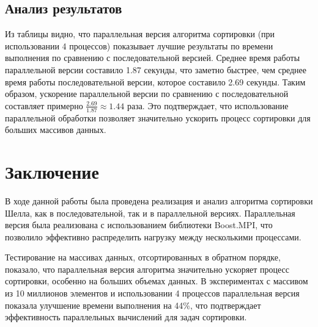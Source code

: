 \documentclass{report}
\begin{document}
\begin{table}[h!]
\centering
{}
\caption{Результаты времени выполнения сортировки для последовательной и параллельной версии}
\end{table}

\subsection*{Анализ результатов}

Из таблицы видно, что параллельная версия алгоритма сортировки (при использовании 4 процессов) показывает лучшие результаты по времени выполнения по сравнению с последовательной версией. Среднее время работы параллельной версии составило 1.87 секунды, что заметно быстрее, чем среднее время работы последовательной версии, которое составило 2.69 секунды. Таким образом, ускорение параллельной версии по сравнению с последовательной составляет примерно \( \frac{2.69}{1.87} \approx 1.44 \) раза. Это подтверждает, что использование параллельной обработки позволяет значительно ускорить процесс сортировки для больших массивов данных.

\newpage

\section*{Заключение}

В ходе данной работы была проведена реализация и анализ алгоритма сортировки Шелла, как в последовательной, так и в параллельной версиях. Параллельная версия была реализована с использованием библиотеки Boost.MPI, что позволило эффективно распределить нагрузку между несколькими процессами.

Тестирование на массивах данных, отсортированных в обратном порядке, показало, что параллельная версия алгоритма значительно ускоряет процесс сортировки, особенно на больших объемах данных. В экспериментах с массивом из 10 миллионов элементов и использовании 4 процессов параллельная версия показала улучшение времени выполнения на 44\%, что подтверждает эффективность параллельных вычислений для задач сортировки. 
\end{document}
